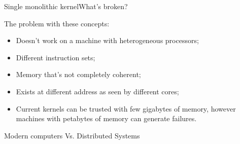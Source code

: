 \documentclass[10pt]{beamer}
\begin{document}
\begin{frame}{Single monolithic kernel}{What's broken?}
  \begin{block}{}
    The problem with these concepts:
  \end{block} \pause

  \begin{itemize}
    \item Doesn't work on a machine with heterogeneous processors; \pause
    \item Different instruction sets; \pause
    \item Memory that's not completely coherent; \pause
    \item Exists at different address as seen by different cores; \pause
    \item Current kernels can be trusted with few gigabytes of memory, however
          machines with petabytes of memory can generate failures.
  \end{itemize}

  \begin{block}
    Modern computers Vs. Distributed Systems
  \end{block}
\end{frame}

\end{document}
